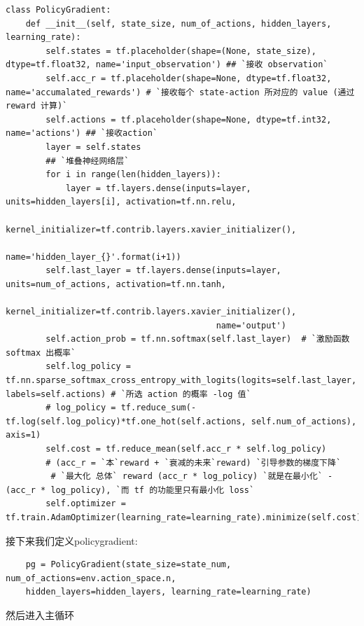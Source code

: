\documentclass[fontset=windows,openany,UTF8]{ctexbook}
\begin{document}
\lstset{language=python}
\begin{lstlisting}
class PolicyGradient:
    def __init__(self, state_size, num_of_actions, hidden_layers, learning_rate):
        self.states = tf.placeholder(shape=(None, state_size), dtype=tf.float32, name='input_observation') ## `接收 observation`
        self.acc_r = tf.placeholder(shape=None, dtype=tf.float32, name='accumalated_rewards') # `接收每个 state-action 所对应的 value (通过 reward 计算)`
        self.actions = tf.placeholder(shape=None, dtype=tf.int32, name='actions') ## `接收action`
        layer = self.states
        ## `堆叠神经网络层`
        for i in range(len(hidden_layers)):
            layer = tf.layers.dense(inputs=layer, units=hidden_layers[i], activation=tf.nn.relu,
                                    kernel_initializer=tf.contrib.layers.xavier_initializer(),
                                    name='hidden_layer_{}'.format(i+1))
        self.last_layer = tf.layers.dense(inputs=layer, units=num_of_actions, activation=tf.nn.tanh,
                                          kernel_initializer=tf.contrib.layers.xavier_initializer(),
                                          name='output')
        self.action_prob = tf.nn.softmax(self.last_layer)  # `激励函数 softmax 出概率`
        self.log_policy = tf.nn.sparse_softmax_cross_entropy_with_logits(logits=self.last_layer, labels=self.actions) # `所选 action 的概率 -log 值`
        # log_policy = tf.reduce_sum(-tf.log(self.log_policy)*tf.one_hot(self.actions, self.num_of_actions), axis=1)
        self.cost = tf.reduce_mean(self.acc_r * self.log_policy) 
        # (acc_r = `本`reward + `衰减的未来`reward) `引导参数的梯度下降`
         # `最大化 总体` reward (acc_r * log_policy) `就是在最小化` -(acc_r * log_policy), `而 tf 的功能里只有最小化 loss`
        self.optimizer = tf.train.AdamOptimizer(learning_rate=learning_rate).minimize(self.cost)
\end{lstlisting}

接下来我们定义policygradient:
\lstset{language=python}
\begin{lstlisting}
    pg = PolicyGradient(state_size=state_num, num_of_actions=env.action_space.n,
    hidden_layers=hidden_layers, learning_rate=learning_rate)
\end{lstlisting}

然后进入主循环
\end{document}
